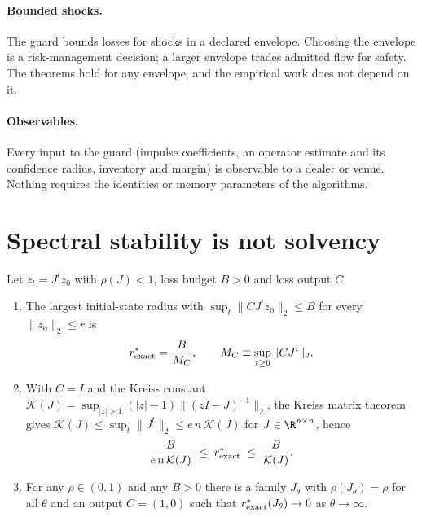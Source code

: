 \paragraph{Bounded shocks.} The guard bounds losses for shocks in a declared envelope. Choosing the envelope is a risk-management decision; a larger envelope trades admitted flow for safety. The theorems hold for any envelope, and the empirical work does not depend on it.

\paragraph{Observables.} Every input to the guard (impulse coefficients, an operator estimate and its confidence radius, inventory and margin) is observable to a dealer or venue. Nothing requires the identities or memory parameters of the algorithms.

\section{Spectral stability is not solvency}\label{sec:radius}

\begin{theorem}\label{thm:radius}
Let $z_t=J^tz_0$ with $\rho(J)<1$, loss budget $B>0$ and loss output $C$.
\begin{enumerate}[label=(\roman*)]
\item The largest initial-state radius with $\sup_t\|CJ^tz_0\|_2\le B$ for every $\|z_0\|_2\le r$ is
\begin{equation}\label{eq:rexact}
r^*_{\rm exact}=\frac{B}{M_C},\qquad M_C\equiv\sup_{t\ge0}\|CJ^t\|_2 .
\end{equation}
\item With $C=I$ and the Kreiss constant $\mathcal K(J)=\sup_{|z|>1}(|z|-1)\|(zI-J)^{-1}\|_2$, the Kreiss matrix theorem gives $\mathcal K(J)\le\sup_t\|J^t\|_2\le e\,n\,\mathcal K(J)$ for $J\in\R^{n\times n}$, hence
\begin{equation}\label{eq:kreiss}
\frac{B}{e\,n\,\mathcal K(J)}\;\le\;r^*_{\rm exact}\;\le\;\frac{B}{\mathcal K(J)} .
\end{equation}
\item For any $\rho\in(0,1)$ and any $B>0$ there is a family $J_\theta$ with $\rho(J_\theta)=\rho$ for all $\theta$ and an output $C=(1,0)$ such that $r^*_{\rm exact}(J_\theta)\to0$ as $\theta\to\infty$.
\end{enumerate}
\end{theorem}

